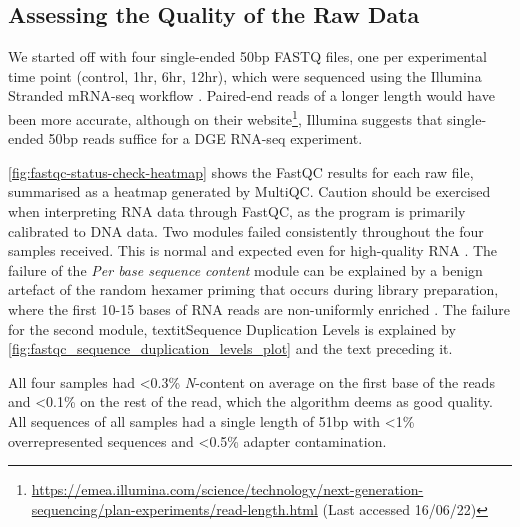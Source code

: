 \subsection{Assessing the Quality of the Raw Data}
\label{Assessing the Quality of the Raw Data}
We started off with four single-ended 50bp FASTQ files, one per experimental time point (control, 1hr, 6hr, 12hr), which were sequenced using the Illumina Stranded mRNA-seq workflow \citep{HiSeq2000}. Paired-end reads of a longer length would have been more accurate, although on their website\footnote{\url{https://emea.illumina.com/science/technology/next-generation-sequencing/plan-experiments/read-length.html} (Last accessed 16/06/22)}, Illumina suggests that single-ended 50bp reads suffice for a \ac{DGE} RNA-seq experiment.

\autoref{fig:fastqc-status-check-heatmap} shows the FastQC results for each raw file, summarised as a heatmap generated by MultiQC. Caution should be exercised when interpreting RNA data through FastQC, as the program is primarily calibrated to DNA data. Two modules failed consistently throughout the four samples received. This is normal and expected even for high-quality RNA \citep{hansen2010biases}. The failure of the \textit{Per base sequence content} module can be explained by a benign artefact of the random hexamer priming that occurs during library preparation, where the first 10-15 bases of RNA reads are non-uniformly enriched \citep{hansen2010biases}. The failure for the second module, textit{Sequence Duplication Levels} is explained by \autoref{fig:fastqc_sequence_duplication_levels_plot} and the text preceding it.

All four samples had <0.3\% \textit{N}-content on average on the first base of the reads and <0.1\% on the rest of the read, which the algorithm deems as good quality. All sequences of all samples had a single length of 51bp with <1\% overrepresented sequences and <0.5\% adapter contamination.







